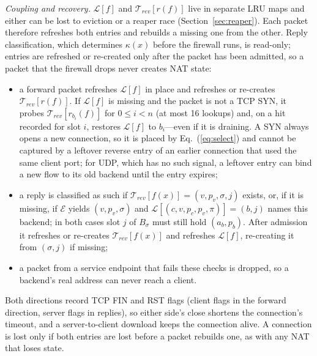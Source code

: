 \documentclass[conference]{IEEEtran}
\begin{document}
\textit{Coupling and recovery.} $\mathcal{L}[f]$ and $\mathcal{T}_{rev}[r(f)]$
live in separate LRU maps and either can be lost to eviction or a reaper race
(Section~\ref{sec:reaper}). Each packet therefore refreshes both entries and
rebuilds a missing one from the other. Reply classification, which
determines $\kappa(x)$ before the firewall runs, is read-only; entries are
refreshed or re-created only after the packet has been admitted, so a packet
that the firewall drops never creates NAT state:
\begin{itemize}
\item a forward packet refreshes $\mathcal{L}[f]$ in place and refreshes or
re-creates $\mathcal{T}_{rev}[r(f)]$. If $\mathcal{L}[f]$ is missing and the
packet is not a TCP SYN, it probes $\mathcal{T}_{rev}[r_{b_i}(f)]$ for
$0 \le i < n$ (at most 16 lookups) and, on a hit recorded for slot $i$,
restores $\mathcal{L}[f]$ to $b_i$---even if it is draining. A SYN always
opens a new connection, so it is placed by Eq.~(\ref{eq:select}) and cannot
be captured by a leftover reverse entry of an earlier connection that used
the same client port; for UDP, which has no such signal, a leftover entry
can bind a new flow to its old backend until the entry expires;
\item a reply is classified as such if $\mathcal{T}_{rev}[f(x)] =
(v,p_v,\sigma,j)$ exists, or, if it is missing, if $\mathcal{E}$ yields
$(v,p_v,\sigma)$ and $\mathcal{L}[(c,v,p_c,p_v,\pi)] = (b,j)$ names this
backend; in both cases slot $j$ of $B_\sigma$ must still hold $(a_b,p_b)$.
After admission it refreshes or re-creates $\mathcal{T}_{rev}[f(x)]$ and
refreshes $\mathcal{L}[f]$, re-creating it from $(\sigma,j)$ if missing;
\item a packet from a service endpoint that fails these checks is dropped,
so a backend's real address can never reach a client.
\end{itemize}
Both directions record TCP FIN and RST flags (client flags in the forward
direction, server flags in replies), so either side's close shortens the
connection's timeout, and a server-to-client download keeps the connection
alive. A connection is lost only if both entries are lost before a packet
rebuilds one, as with any NAT that loses state.
\end{document}
